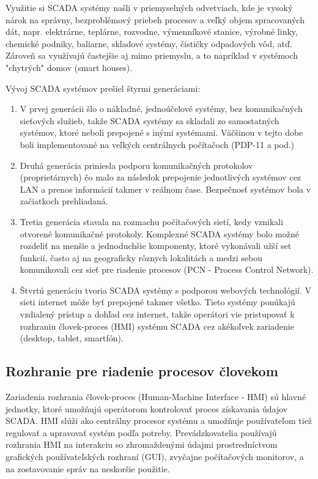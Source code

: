 \documentclass[]{tukediphc}
\begin{document}
Využitie si SCADA systémy našli v priemyselných odvetviach, kde je vysoký nárok na správny, bezproblémový priebeh procesov a veľký objem spracovaných dát, napr. elektrárne, teplárne, rozvodne, výmenníkové stanice, výrobné linky, chemické podniky, baliarne, skladové systémy, čističky odpadových vôd, atď. Zároveň sa využívajú častejšie aj mimo priemyslu, a to napríklad v systémoch "chytrých" domov (smart houses).

Vývoj SCADA systémov prešiel štyrmi generáciami:

\begin{enumerate}
	\item{V prvej generácii šlo o nákladné, jednoúčelové systémy, bez komunikačných sieťových služieb, takže SCADA systémy sa skladali zo samostatných systémov, ktoré neboli prepojené s inými systémami. Väčšinou v tejto dobe boli implementované na veľkých centrálnych počítačoch (PDP-11 a pod.)}
	\item{Druhá generácia priniesla podporu komunikačných protokolov (proprietárnych) čo malo za následok prepojenie jednotlivých systémov cez LAN a prenos informácií takmer v reálnom čase. Bezpečnosť systémov bola v začiatkoch prehliadaná.}
	\item{Tretia generácia stavala na rozmachu počítačových sietí, kedy vznikali otvorené komunikačné protokoly. Komplexné SCADA systémy bolo možné rozdeliť na menšie a jednoduchšie komponenty, ktoré vykonávali užší set funkcií, často aj na geograficky rôznych lokalitách a medzi sebou komunikovali cez sieť pre riadenie procesov (PCN - Process Control Network).}
	\item{Štvrtú generáciu tvoria SCADA systémy s podporou webových technológií. V sieti internet môže byť prepojené takmer všetko. Tieto systémy ponúkajú vzdialený prístup a dohľad cez internet, takže operátori vie pristupovať k rozhraniu človek-proces (HMI) systému SCADA cez akékoľvek zariadenie (desktop, tablet, smartfón).}
\end{enumerate}

\subsection{Rozhranie pre riadenie procesov človekom}

Zariadenia rozhrania človek-proces (Human-Machine Interface - HMI) sú hlavné jednotky, ktoré umožňujú operátorom kontrolovať proces získavania údajov SCADA. HMI slúži ako centrálny procesor systému a umožňuje používateľom tiež regulovať a upravovať systém podľa potreby. Prevádzkovatelia používajú rozhrania HMI na interakciu so zhromaždenými údajmi prostredníctvom grafických používateľských rozhraní (GUI), zvyčajne počítačových monitorov, a na zostavovanie správ na neskoršie použitie.
\end{document}
